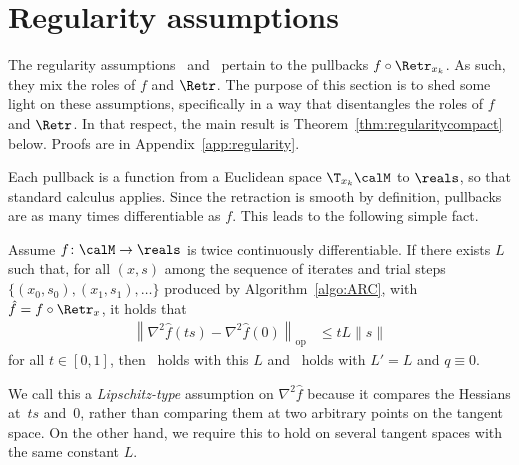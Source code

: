 
\section{Regularity assumptions} \label{sec:regularity}

The regularity assumptions~ and~ pertain to the pullbacks $f \circ \Retr_{x_k}$. As such, they mix the roles of $f$ and $\Retr$. The purpose of this section is to shed some light on these assumptions, specifically in a way that disentangles the roles of $f$ and $\Retr$. In that respect, the main result is Theorem~\ref{thm:regularitycompact} below. Proofs are in Appendix~\ref{app:regularity}.

Each pullback is a function from a Euclidean space $\T_{x_k}\calM$ to $\reals$, so that standard calculus applies. Since the retraction is smooth by definition, pullbacks are as many times differentiable as $f$. This leads to the following simple fact.
\begin{lemma} \label{lem:lipschitzhessianbasic}
	Assume $f \colon \calM \to \reals$ is twice continuously differentiable.
	If there exists $L$ such that, for all $(x, s)$ among the sequence of iterates and trial steps $\{(x_0, s_0), (x_1, s_1), \ldots\}$ produced by Algorithm~\ref{algo:ARC}, with $\hat f = f \circ \Retr_x$, it holds that
	\begin{align}
		\left\| \nabla^2 \hat f(ts) - \nabla^2 \hat f(0) \right\|_{\mathrm{op}} & \leq t L \|s\|
		\label{eq:lipschitzhessianbasic}
	\end{align}
	for all $t \in [0, 1]$, then~ holds with this $L$ and~ holds with $L' = L$ and $q \equiv 0$.
\end{lemma}

We call this a \emph{Lipschitz-type} assumption on $\nabla^2 \hat f$ because it compares the Hessians at~$ts$ and~0, rather than comparing them at two arbitrary points on the tangent space. On the other hand, we require this to hold on several tangent spaces with the same constant $L$.


